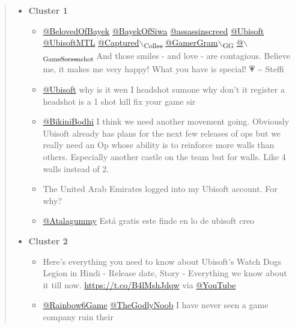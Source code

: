 \documentclass[11pt]{article}
\begin{document}
\begin{quote}
\begin{itemize}
\item \textbf{Cluster 1}
\begin{itemize}
\item \href{https://twitter.com/search?q=\%40BelovedOfBayek\&src=typed\_query}{@BelovedOfBayek}
 \href{https://twitter.com/search?q=\%40BayekOfSiwa\&src=typed\_query}{@BayekOfSiwa} \href{https://twitter.com/search?q=\%40assassinscreed\&src=typed\_query}{@assassinscreed} \href{https://twitter.com/search?q=\%40Ubisoft\&src=typed\_query}{@Ubisoft} \href{https://twitter.com/search?q=\%40UbisoftMTL\&src=typed\_query}{@UbisoftMTL}
\href{https://twitter.com/search?q=\%40Captured\_Collec\&src=typed\_query}{@Captured$\backslash$\textsubscript{Collec}} \href{https://twitter.com/search?q=\%40GamerGram\_GG\&src=typed\_query}{@GamerGram$\backslash$\textsubscript{GG}} \href{https://twitter.com/search?q=\%40\_GameScreenshot\&src=typed\_query}{@$\backslash$\textsubscript{GameScreenshot}} And those smiles - and
love - are contagious. Believe me, it makes me very happy! What you have is
special! 💗 \textasciitilde{} Steffi
\item \href{https://twitter.com/search?q=\%40Ubisoft}{@Ubisoft} why is it wen I headshot sumone why don’t it register a headshot
is a 1 shot kill fix your game sir
\item \href{https://twitter.com/search?q=\%40BikiniBodhi}{@BikiniBodhi} I think we need another movement going. Obviously Ubisoft
already has plans for the next few releases of ops but we really need an Op
whose ability is to reinforce more walls than others. Especially another
castle on the team but for walls. Like 4 walls instead of 2.
\item The United Arab Emirates logged into my Ubisoft account. For why?
\item \href{https://twitter.com/search?q=\%40Atalagummy}{@Atalagummy} Está gratis este finde en lo de ubisoft creo
\end{itemize}
\item \textbf{Cluster 2}
\begin{itemize}
\item Here's everything you need to know about Ubisoft's Watch Dogs Legion in
Hindi - Release date, Story - Everything we know about it till now.
\url{https://t.co/B4lMshJdqw} via \href{https://twitter.com/search?q=\%40YouTube}{@YouTube}
\item \href{https://twitter.com/search?q=\%40Rainbow6Game}{@Rainbow6Game} \href{https://twitter.com/search?q=\%40TheGodlyNoob}{@TheGodlyNoob} I have never seen a game company ruin their

\end{itemize}
\end{itemize}
\end{quote}
\end{document}
